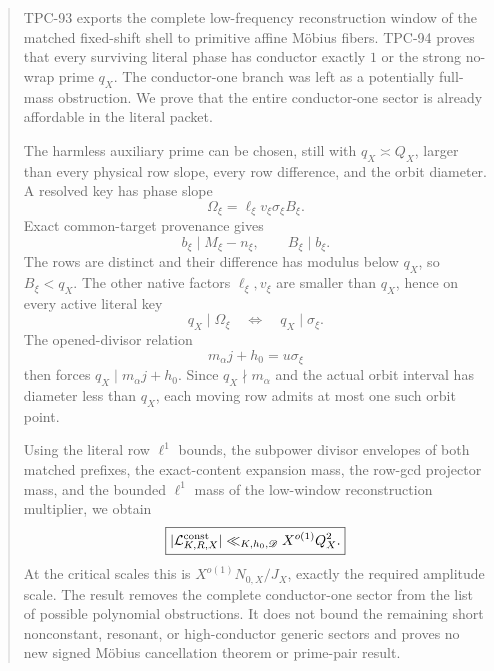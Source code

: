 \begin{abstract}
TPC-93 exports the complete low-frequency reconstruction window of
the matched fixed-shift shell to primitive affine M\"obius fibers.
TPC-94 proves that every surviving literal phase has conductor
exactly \(1\) or the strong no-wrap prime \(q_X\).  The conductor-one
branch was left as a potentially full-mass obstruction.  We prove
that the entire conductor-one sector is already affordable in the
literal packet.

The harmless auxiliary prime can be chosen, still with
\(q_X\asymp Q_X\), larger than every physical row slope, every row
difference, and the orbit diameter.  A resolved key has
phase slope
\[
 \Omega_\xi=\ell_\xi v_\xi\sigma_\xi B_\xi .
\]
Exact common-target provenance gives
\[
 b_\xi\mid M_\xi-n_\xi,\qquad B_\xi\mid b_\xi.
\]
The rows are distinct and their difference has modulus below
\(q_X\), so \(B_\xi<q_X\).  The other native factors
\(\ell_\xi,v_\xi\) are smaller than \(q_X\), hence on every active
literal key
\[
 q_X\mid\Omega_\xi
 \quad\Longleftrightarrow\quad
 q_X\mid\sigma_\xi.
\]
The opened-divisor relation
\[
 m_\alpha j+h_0=u\sigma_\xi
\]
then forces \(q_X\mid m_\alpha j+h_0\).  Since
\(q_X\nmid m_\alpha\) and the actual orbit interval has diameter
less than \(q_X\), each moving row admits at most one such orbit
point.

Using the literal row \(\ell^1\) bounds, the subpower divisor
envelopes of both matched prefixes, the exact-content expansion mass,
the row-gcd projector mass, and the bounded \(\ell^1\) mass of the
low-window reconstruction multiplier, we obtain
\[
 \boxed{
 |\mathcal L^{\rm const}_{K,R,X}|
 \ll_{K,h_0,\mathscr D}
 X^{o(1)}Q_X^2.}
\]
At the critical scales this is
\(X^{o(1)}N_{0,X}/J_X\), exactly the required amplitude scale.
The result removes the complete conductor-one sector from the list
of possible polynomial obstructions.  It does not bound the
remaining short nonconstant, resonant, or high-conductor generic
sectors and proves
no new signed M\"obius cancellation theorem or prime-pair result.
\end{abstract}
